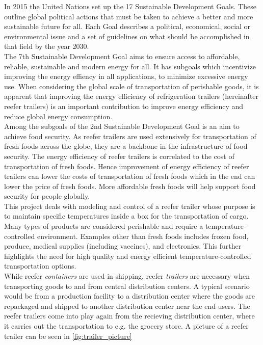 In 2015 the United Nations set up the 17 Sustainable Development Goals. These outline global political actions that must be taken to achieve a better and more sustainable future for all. Each Goal describes a political, economical, social or environmental issue and a set of guidelines on what should be accomplished in that field by the year 2030.\\

The 7th Sustainable Development Goal\cite{UNdev_goal7} aims to ensure access to affordable, reliable, sustainable and modern energy for all. It has subgoals which incentivize improving the energy effiency in all applications, to minimize excessive energy use. When considering the global scale of transportation of perishable goods, it is apparent that improving the energy efficiency of refrigeration trailers (hereinafter reefer trailers) is an important contribution to improve energy efficiency and reduce global energy consumption. \\


Among the subgoals of the 2nd Sustainable Development Goal \cite{UNdev_goal2} is an aim to achieve food security. As reefer trailers are used extensively for transportation of fresh foods across the globe, they are a backbone in the infrastructure of food security. The energy efficiency of reefer trailers is correlated to the cost of transportation of fresh foods. Hence improvement of energy efficiency of reefer trailers can lower the costs of transportation of fresh foods which in the end can lower the price of fresh foods. More affordable fresh foods will help support food security for people globally.\\
   

This project deals with modeling and control of a reefer trailer whose purpose is to maintain specific temperatures inside a box for the transportation of cargo. Many types of products are considered perishable and require  a temperature-controlled environment. Examples other than fresh foods includes frozen food, produce, medical supplies (including vaccines), and electronics. This further highlights the need for high quality and energy efficient temperature-controlled transportation options. \\
While reefer \textit{containers} are used in shipping, reefer \textit{trailers} are necessary when transporting goods to and from central distribution centers. A typical scenario would be from a production facility to a distribution center where the goods are repackaged and shipped to another distribution center near the end users. The reefer trailers come into play again from the recieving distribution center,  where it carries out the transportation to e.g. the grocery store. A picture of a reefer trailer can be seen in \cref{fig:trailer_picture}

